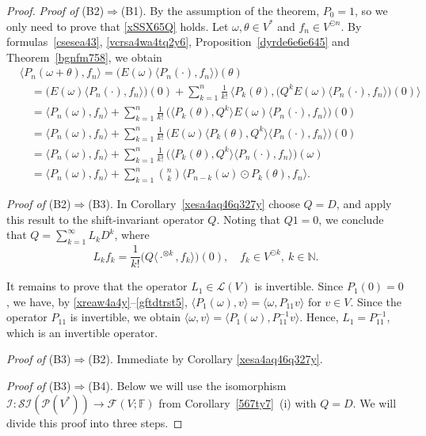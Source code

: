 \documentclass[12pt]{article}
\theoremstyle{remark}
\theoremstyle{remark}
\theoremstyle{remark}
\begin{document}
\begin{proof}
{\it Proof of\/} (B2)$\Rightarrow$(B1).  By the assumption of the theorem, $P_0=1$, so we only need to prove that \eqref{xSSX65Q} holds. Let $\omega,\theta\in V^*$ and $f_n\in V^{\odot n}$. By formulas~\eqref{csesea43}, \eqref{vcrsa4wa4tq2y6}, Proposition~\ref{dyrde6e6e645} and Theorem~\ref{bgnfm758}, we obtain 
\begin{align*}
&\langle P_n(\omega+\theta),f_n\rangle=\big(E(\omega)\langle P_n(\cdot),f_n\rangle\big)(\theta)\\
&\quad= \big(E(\omega)\langle P_n(\cdot),f_n\rangle\big)(0)+\sum_{k=1}^n\frac1{k!}\,\big\langle P_k(\theta),\big(Q^{k}E(\omega)\langle P_n(\cdot),f_n\rangle\big)(0)\big\rangle\\
&\quad= \langle P_n(\omega),f_n\rangle+\sum_{k=1}^n\frac1{k!}\, 
\big(\langle P_k(\theta),Q^{k}\rangle  E(\omega)\langle P_n(\cdot),f_n\rangle\big)(0)\\
&\quad= \langle P_n(\omega),f_n\rangle+\sum_{k=1}^n\frac1{k!}\, 
\big(E(\omega)\langle P_k(\theta),Q^{k}\rangle  \langle P_n(\cdot),f_n\rangle\big)(0)\\
&\quad= \langle P_n(\omega),f_n\rangle+\sum_{k=1}^n\frac1{k!}\, 
\big(\langle P_k(\theta),Q^{k}\rangle  \langle P_n(\cdot),f_n\rangle\big)(\omega)\\
&\quad= \langle P_n(\omega),f_n\rangle+\sum_{k=1}^n\binom n k\big\langle P_{n-k}(\omega)\odot P_k(\theta),f_n\big\rangle. 
\end{align*}


{\it Proof of\/} (B2)$\Rightarrow$(B3). In Corollary~\ref{xesa4aq46q327y} choose $Q=D$, and apply this result to the shift-invariant operator $Q$. Noting that $Q1=0$, we conclude that  $Q=\sum_{k=1}^\infty L_kD^{k}$, where 
$$L_kf_k=\frac1{k!}\big(Q\langle\cdot^{\otimes k},f_k\rangle\big)(0),\quad f_k\in V^{\odot k},\ k\in\mathbb N.$$


It remains to prove that the operator $L_1\in\mathcal L(V)$ is invertible. Since $P_1(0)=0$, we have, by \eqref{xreaw4a4y}--\eqref{gftdtrst5}, $\langle P_1(\omega),v\rangle=\langle\omega,P_{11}v\rangle$ for $ v\in V$. 
Since the operator $P_{11}$ is invertible, we obtain $\langle\omega,v\rangle=\langle P_1(\omega), P^{-1}_{11}v\rangle$.
 Hence, $L_1=P_{11}^{-1}$, which is an invertible operator. 


{\it Proof of\/} (B3)$\Rightarrow$(B2).  Immediate by Corollary \ref{xesa4aq46q327y}.  


{\it Proof of\/} (B3)$\Rightarrow$(B4). Below we will use the isomorphism  $\mathcal I:\mathcal{SI}(\mathcal P  (V^*))\to \mathcal F(V;\mathbb F)$ from Corollary~\ref{567ty7}~(i) with $Q=D$. 
We will divide this proof into three steps.



\end{proof}
\end{document}
